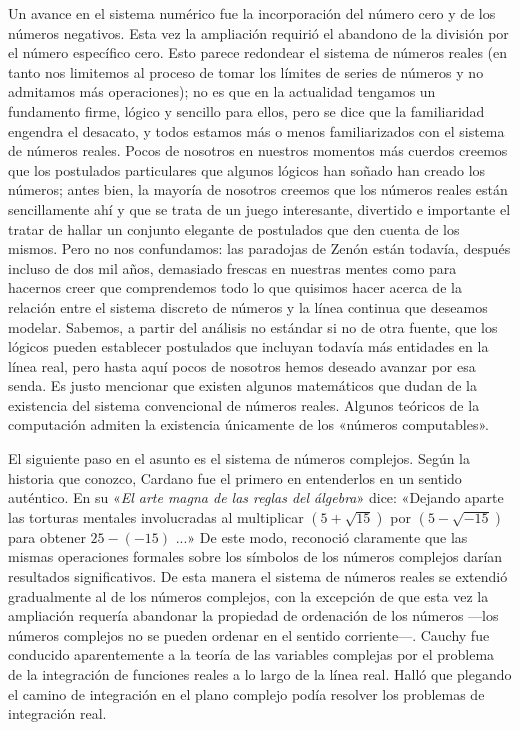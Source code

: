 \documentclass[a4paper, 12pt]{article}
\begin{document}
 

Un avance en el sistema numérico fue la incorporación del número cero y de los números negativos. Esta vez la ampliación requirió el abandono de la división por el número específico cero. Esto parece redondear el sistema de números reales (en tanto nos limitemos al proceso de tomar los límites de series de números y no admitamos más operaciones); no es que en la actualidad tengamos un fundamento firme, lógico y sencillo para ellos, pero se dice que la familiaridad engendra el desacato, y todos estamos más o menos familiarizados con el sistema de números reales. Pocos de nosotros en nuestros momentos más cuerdos creemos que los postulados particulares que algunos lógicos han soñado han creado los números; antes bien, la mayoría de nosotros creemos que los números reales están sencillamente ahí y que se  trata de un juego interesante, divertido e importante el tratar de hallar un conjunto elegante de postulados que den cuenta de los mismos. Pero no nos confundamos: las paradojas de Zenón están todavía, después incluso de dos mil años, demasiado frescas en nuestras mentes como para hacernos creer que comprendemos todo lo que quisimos hacer acerca de la relación entre el sistema discreto de números y la línea continua que deseamos modelar. Sabemos, a partir del análisis no estándar si no de otra fuente, que los lógicos pueden establecer postulados que incluyan todavía más entidades en la línea real, pero hasta aquí pocos de nosotros hemos deseado avanzar por esa senda. Es justo mencionar que existen algunos matemáticos que dudan de la existencia del sistema convencional de números reales. Algunos teóricos de la computación admiten la existencia únicamente de los «números computables».

 

El siguiente paso en el asunto es el sistema de números complejos. Según la historia que conozco, Cardano fue el primero en entenderlos en un sentido auténtico. En su «{\it El arte magna de las reglas del álgebra}»  dice: «Dejando aparte las torturas mentales involucradas al multiplicar $(5 + \sqrt{15})$ por $(5 - \sqrt{ -15})$ para obtener $25-(-15)$ ...» De este modo, reconoció claramente que las mismas operaciones formales sobre los símbolos de los números complejos darían resultados significativos. De esta manera el sistema de números reales se extendió gradualmente al de los números complejos, con la excepción de que esta vez la ampliación requería abandonar la propiedad de ordenación de los números ---los números complejos no se pueden ordenar en el sentido corriente---. Cauchy fue conducido aparentemente a la teoría de las variables complejas por el problema de la integración de funciones reales a lo largo de la línea real. Halló que plegando el camino de integración en el plano complejo podía resolver los problemas de integración real.
\end{document}
